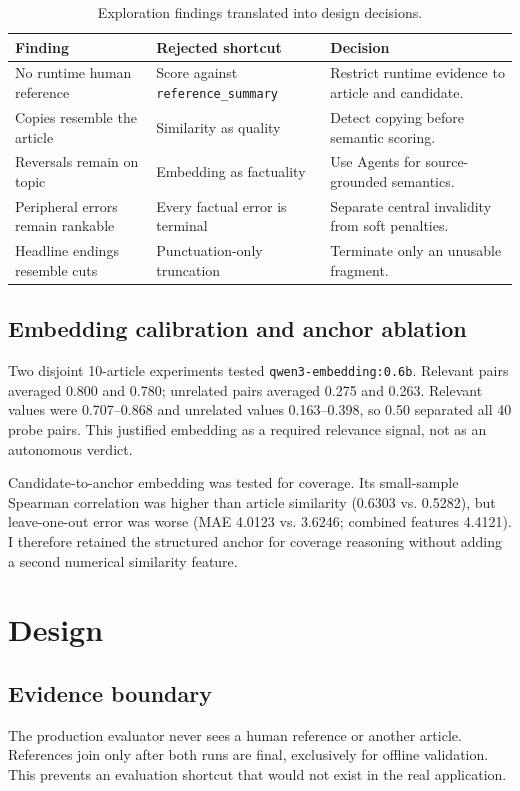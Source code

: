 \documentclass[conference]{IEEEtran}
\begin{document}
\begin{table}[t]
\caption{Exploration findings translated into design decisions.}
\label{tab:exploration}
\centering
\footnotesize
\begin{tabularx}{\columnwidth}{@{}p{19mm}YY@{}}
\toprule
\textbf{Finding} & \textbf{Rejected shortcut} & \textbf{Decision} \\
\midrule
No runtime human reference & Score against \texttt{reference\_summary} & Restrict runtime evidence to article and candidate. \\
Copies resemble the article & Similarity as quality & Detect copying before semantic scoring. \\
Reversals remain on topic & Embedding as factuality & Use Agents for source-grounded semantics. \\
Peripheral errors remain rankable & Every factual error is terminal & Separate central invalidity from soft penalties. \\
Headline endings resemble cuts & Punctuation-only truncation & Terminate only an unusable fragment. \\
\bottomrule
\end{tabularx}
\end{table}

\subsection{Embedding calibration and anchor ablation}
Two disjoint 10-article experiments tested \texttt{qwen3-embedding:0.6b}. Relevant pairs averaged 0.800 and 0.780; unrelated pairs averaged 0.275 and 0.263. Relevant values were 0.707--0.868 and unrelated values 0.163--0.398, so 0.50 separated all 40 probe pairs. This justified embedding as a required relevance signal, not as an autonomous verdict.

Candidate-to-anchor embedding was tested for coverage. Its small-sample Spearman correlation was higher than article similarity (0.6303 vs. 0.5282), but leave-one-out error was worse (MAE 4.0123 vs. 3.6246; combined features 4.4121). I therefore retained the structured anchor for coverage reasoning without adding a second numerical similarity feature.

\section{Design}
\subsection{Evidence boundary}
The production evaluator never sees a human reference or another article. References join only after both runs are final, exclusively for offline validation. This prevents an evaluation shortcut that would not exist in the real application.
\end{document}
